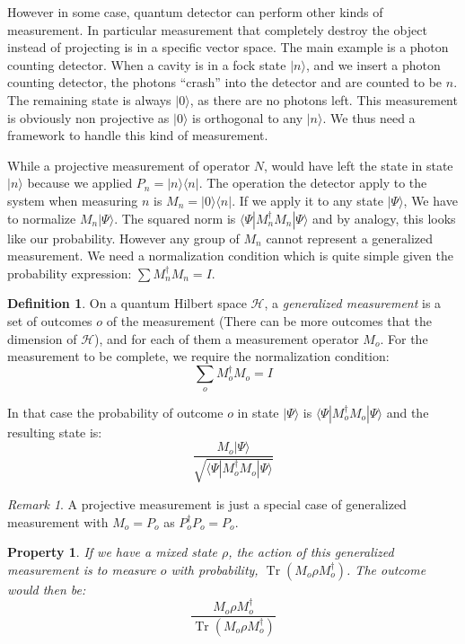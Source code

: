 \documentclass[10pt]{report}
\theoremstyle{plain}
\newtheorem{prop}[thm]{Property}
\theoremstyle{definition}
\newtheorem{defn}{Definition}[chapter]
\theoremstyle{remark}
\newtheorem*{rem}{Remark}
\newcommand{\ket}[1]{|#1\rangle}
\newcommand{\bra}[1]{\langle#1|}
\DeclareMathOperator{\Tr}{Tr}
\newcommand{\trnorm}[1]{\frac{#1}{\Tr\left({#1}\right)}}
\begin{document}
However in some case, quantum detector can perform other kinds of measurement.
In particular measurement that completely destroy the object instead of
projecting is in a specific vector space. The main example is a photon counting
detector. When a cavity is in a fock state $\ket n$, and we insert a photon
counting detector, the photons ``crash'' into the detector and are counted to be
$n$. The remaining state is always $\ket 0$, as there are no photons left. This
measurement is obviously non projective as $\ket 0$ is orthogonal to any $\ket
n$. We thus need a framework to handle this kind of measurement.

While a projective measurement of operator $N$, would have left the state in
state $\ket n$ because we applied $P_n = \ket n \bra n$.
The operation the detector apply to the system when measuring $n$ is $M_n = \ket
0 \bra n$. If we apply it to any state $\ket \Psi$, We have to normalize $M_n
\ket \Psi$. The squared norm is $\bra \Psi M_n^\dagger M_n \ket \Psi$ and by
analogy, this looks like our probability. However any group of $M_n$ cannot
represent a generalized measurement. We need a normalization condition which is
quite simple given the probability expression: $\sum M_n^\dagger M_n = I$.

\begin{defn}
  On a quantum Hilbert space $\mathcal{H}$, a \emph{generalized measurement} is a set
  of outcomes $o$ of the measurement (There can be more outcomes that the
  dimension of $\mathcal{H}$), and for each of them a measurement
  operator $M_o$. For the measurement to be complete, we require the
  normalization condition:
  \[\sum_o M_o^\dagger M_o = I\]

  In that case the probability of outcome $o$ in state $\ket \Psi$ is $\bra \Psi
  M_o^\dagger M_o \ket \Psi$ and the resulting state is:
\[\frac{M_o \ket \Psi}{\sqrt{\bra \Psi M_o^\dagger M_o \ket \Psi}}\]
\end{defn}

\begin{rem}
  A projective measurement is just a special case of generalized measurement
  with $M_o=P_o$ as $P_o^\dagger P_o = P_o$.
\end{rem}

\begin{prop}
  If we have a mixed state $\rho$, the action of this generalized measurement is
  to measure $o$ with probability, $\Tr(M_o\rho M_o^\dagger)$. The outcome would
  then be:
  \[\trnorm{M_o\rho M_o^\dagger}\]
\end{prop}
\end{document}
